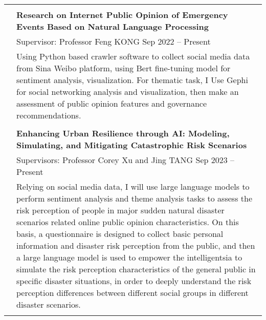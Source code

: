\documentclass[letterpaper, 11pt]{article}
\begin{document}
\begin{longtable}{p{1.3in}p{4.8in}}
&\\




\nohyphens{\color{RoyalBlue}{Research Experience}} 
& \textbf{Research on Internet Public Opinion of Emergency Events Based on Natural Language Processing} \\
& Supervisor: Professor Feng KONG  \hfill Sep 2022 -- Present \\
& Using Python based crawler software to collect social media data from Sina Weibo platform, using Bert fine-tuning model for sentiment analysis, visualization. For thematic task, I Use Gephi for social networking analysis and visualization, then make an assessment of public opinion features and governance recommendations. \\
& \\

& \textbf{Enhancing Urban Resilience through AI: Modeling, Simulating, and Mitigating Catastrophic Risk Scenarios
} \\
& Supervisors: Professor Corey Xu and Jing TANG \hfill Sep 2023 -- Present \\
& Relying on social media data, I will use large language models to perform sentiment analysis and theme analysis tasks to assess the risk perception of people in major sudden natural disaster scenarios related online public opinion characteristics. On this basis, a questionnaire is designed to collect basic personal information and disaster risk perception from the public, and then a large language model is used to empower the intelligentsia to simulate the risk perception characteristics of the general public in specific disaster situations, in order to deeply understand the risk perception differences between different social groups in different disaster scenarios.\\
& \\




\end{longtable}
\end{document}
